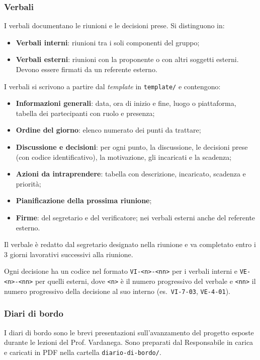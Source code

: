 \documentclass[12pt,a4paper]{article}
\newcommand{\tightlist}{\setlength{\itemsep}{1pt}\setlength{\parskip}{0pt}}
\begin{document}
\subsubsection{Verbali}\label{sec:verbali}
I verbali documentano le riunioni e le decisioni prese. Si distinguono in:
\begin{itemize}
\tightlist
\item \textbf{Verbali interni}: riunioni tra i soli componenti del gruppo;
\item \textbf{Verbali esterni}: riunioni con la proponente o con altri soggetti esterni. Devono essere firmati da un referente esterno.
\end{itemize}
I verbali si scrivono a partire dal \emph{template} in \texttt{template/} e contengono:
\begin{itemize}
\tightlist
\item \textbf{Informazioni generali}: data, ora di inizio e fine, luogo o piattaforma, tabella dei partecipanti con ruolo e presenza;
\item \textbf{Ordine del giorno}: elenco numerato dei punti da trattare;
\item \textbf{Discussione e decisioni}: per ogni punto, la discussione, le decisioni prese (con codice identificativo), la motivazione, gli incaricati e la scadenza;
\item \textbf{Azioni da intraprendere}: tabella con descrizione, incaricato, scadenza e priorità;
\item \textbf{Pianificazione della prossima riunione};
\item \textbf{Firme}: del segretario e del verificatore; nei verbali esterni anche del referente esterno.
\end{itemize}
Il verbale è redatto dal segretario designato nella riunione e va completato entro i 3 giorni lavorativi successivi alla riunione.

Ogni decisione ha un codice nel formato \texttt{VI-<n>-<nn>} per i verbali interni e \texttt{VE-<n>-<nn>} per quelli esterni, dove \texttt{<n>} è il numero progressivo del verbale e \texttt{<nn>} il numero progressivo della decisione al suo interno (es.\ \texttt{VI-7-03}, \texttt{VE-4-01}).

\subsubsection{Diari di bordo}\label{sec:diari}
I diari di bordo sono le brevi presentazioni sull'avanzamento del progetto esposte durante le lezioni del Prof. Vardanega. Sono preparati dal Responsabile in carica e caricati in PDF nella cartella \texttt{diario-di-bordo/}. 
\end{document}

